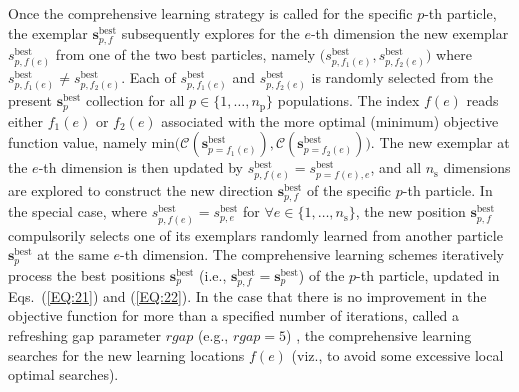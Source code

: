 \documentclass[preprint,3p]{elsarticle}
\begin{document}
\begin{linenumbers}
Once the comprehensive learning strategy is called for the specific $p$-th particle, the exemplar $\textbf{s}_{p,f}^\text{best}$ subsequently explores for the $e$-th dimension the new exemplar $s_{p,f(e)}^\text{best}$ from one of the two best particles, namely $\bigl(s_{p,f_1(e)}^\text{best},s_{p,f_2(e)}^\text{best}\bigr)$ where $s_{p,f_1(e)}^\text{best} \neq s_{p,f_2(e)}^\text{best}$. Each of $s_{p,f_1(e)}^\text{best}$ and $s_{p,f_2(e)}^\text{best}$ is randomly selected from the present $\textbf{s}_p^\text{best}$ collection for all $p\in \{1,\dots,n_\text{p}\}$ populations. The index $f(e)$ reads either $f_1(e)$ or $f_2(e)$ associated with the more optimal (minimum) objective function value, namely $\text{min}\bigl(\mathcal{C}(\textbf{s}_{p=f_1(e)}^\text{best}), \mathcal{C}(\textbf{s}_{p=f_2(e)}^\text{best})\bigr)$. The new exemplar at the $e$-th dimension is then updated by $s_{p,f(e)}^\text{best}=s_{p=f(e),e}^\text{best}$, and all $n_\text{s}$ dimensions are explored to construct the new direction $\textbf{s}_{p,f}^\text{best}$ of the specific $p$-th particle. In the special case, where $s_{p,f(e)}^\text{best}=s_{p,e}^\text{best}$ for $\forall e \in \{1,\dots, n_\text{s}\}$, the new position $\textbf{s}_{p,f}^\text{best}$ compulsorily selects one of its exemplars randomly learned from another particle $\textbf{s}_{p}^\text{best}$ at the same $e$-th dimension. The comprehensive learning schemes iteratively process the best positions $\textbf{s}_{p}^\text{best}$ (i.e., $\textbf{s}_{p,f}^\text{best}=\textbf{s}_{p}^\text{best}$) of the $p$-th particle, updated in Eqs.~(\ref{EQ:21}) and (\ref{EQ:22}). In the case that there is no improvement in the objective function for more than a specified number of iterations, called a refreshing gap parameter $rgap$ (e.g., $rgap = 5$) \cite{Liang2006}, the comprehensive learning searches for the new learning locations $f(e)$ (viz., to avoid some excessive local optimal searches).


\end{linenumbers}
\end{document}
